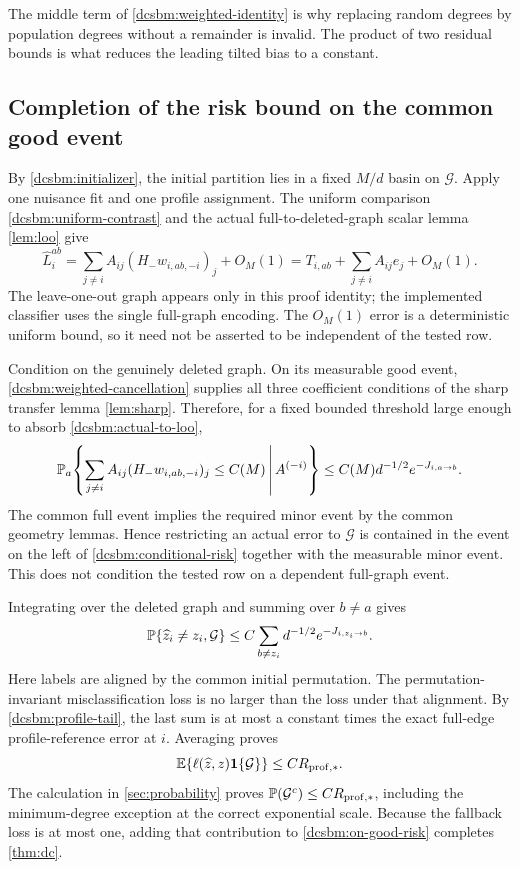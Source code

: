 The middle term of \cref{dcsbm:weighted-identity} is why replacing
random degrees by population degrees without a remainder is invalid.
The product of two residual bounds is what reduces the leading
tilted bias to a constant.

\subsection{Completion of the risk bound on the common good event}

By \cref{dcsbm:initializer}, the initial partition lies in a fixed
\(M/d\) basin on \(\mathcal G\).  Apply one nuisance fit and one
profile assignment.  The uniform comparison
\cref{dcsbm:uniform-contrast} and the actual full-to-deleted-graph
scalar lemma \cref{lem:loo} give
\begin{equation}
 \widehat L_i^{ab}
 =\sum_{j\ne i}A_{ij}(H_-w_{i,ab,-i})_j+O_M(1)
 =T_{i,ab}+\sum_{j\ne i}A_{ij}e_j+O_M(1).
 \label{dcsbm:actual-to-loo}
\end{equation}
The leave-one-out graph appears only in this proof identity; the
implemented classifier uses the single full-graph encoding.
The \(O_M(1)\) error is a deterministic uniform bound, so it need
not be asserted to be independent of the tested row.

Condition on the genuinely deleted graph.  On its measurable good
event, \cref{dcsbm:weighted-cancellation} supplies all three
coefficient conditions of the sharp transfer lemma
\cref{lem:sharp}.  Therefore, for a fixed bounded threshold large
enough to absorb \cref{dcsbm:actual-to-loo},
\begin{equation}
 \mathbb P_a\!\left\{
     \sum_{j\ne i}A_{ij}(H_-w_{i,ab,-i})_j\le C(M)
       \,\middle|\, A^{(-i)}
          \right\}
 \le C(M)d^{-1/2}e^{-J_{i,a\to b}} .
 \label{dcsbm:conditional-risk}
\end{equation}
The common full event implies the required minor event by the
common geometry lemmas.  Hence restricting an actual error to
\(\mathcal G\) is contained in the event on the left of
\cref{dcsbm:conditional-risk} together with the measurable minor
event.  This does not condition the tested row on a dependent
full-graph event.

Integrating over the deleted graph and summing over \(b\ne a\)
gives
\[
 \mathbb P\{\widehat z_i\ne z_i,\mathcal G\}
 \le C\sum_{b\ne z_i}d^{-1/2}e^{-J_{i,z_i\to b}}.
\]
Here labels are aligned by the common initial permutation.
The permutation-invariant misclassification loss is no larger
than the loss under that alignment.  By
\cref{dcsbm:profile-tail}, the last sum is at most a constant
times the exact full-edge profile-reference error at \(i\).
Averaging proves
\begin{equation}
 \mathbb E\{\ell(\widehat z,z)\mathbf1\{\mathcal G\}\}
 \le C R_{\mathrm{prof},*}.
 \label{dcsbm:on-good-risk}
\end{equation}
The calculation in \cref{sec:probability} proves
\(\mathbb P(\mathcal G^c)\le C R_{\mathrm{prof},*}\), including the
minimum-degree exception at the correct exponential scale.
Because the fallback loss is at most one, adding that contribution
to \cref{dcsbm:on-good-risk} completes \cref{thm:dc}.

